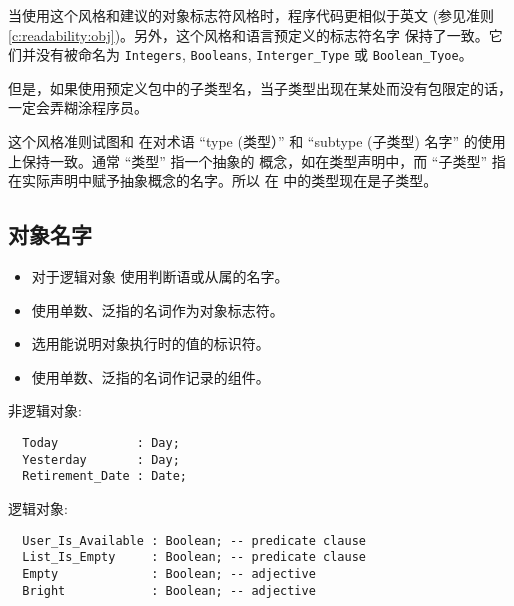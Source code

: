 \begin{blockindent}
当使用这个风格和建议的对象标志符风格时，程序代码更相似于英文
(参见准则\ref{c:readability:obj})。另外，这个风格和语言预定义的标志符名字
保持了一致。它们并没有被命名为 \texttt{Integers}, \texttt{Booleans},
\texttt{Interger\_Type} 或 \texttt{Boolean\_Tyoe}。

但是，如果使用预定义包中的子类型名，当子类型出现在某处而没有包限定的话，
一定会弄糊涂程序员。
\end{blockindent}

\begin{blockindent}
这个风格准则试图和 \cite{arm95} 在对术语 ``type (类型）''
和 ``subtype (子类型) 名字'' 的使用上保持一致。通常 ``类型'' 指一个抽象的
概念，如在类型声明中，而 ``子类型'' 指在实际声明中赋予抽象概念的名字。所以
在 \cite{arm83} 中的类型现在是子类型。
\end{blockindent}

\subsection{对象名字}
\begin{itemize}
    \item 对于逻辑对象 使用判断语或从属的名字。
    \item 使用单数、泛指的名词作为对象标志符。
    \item 选用能说明对象执行时的值的标识符。
    \item 使用单数、泛指的名词作记录的组件。
\end{itemize}

\begin{blockindent}
\noindent
非逻辑对象:
\begin{lstlisting}
  Today           : Day;
  Yesterday       : Day;
  Retirement_Date : Date;
\end{lstlisting}
逻辑对象:
\begin{lstlisting}
  User_Is_Available : Boolean; -- predicate clause
  List_Is_Empty     : Boolean; -- predicate clause
  Empty             : Boolean; -- adjective
  Bright            : Boolean; -- adjective
\end{lstlisting}
\end{blockindent}

